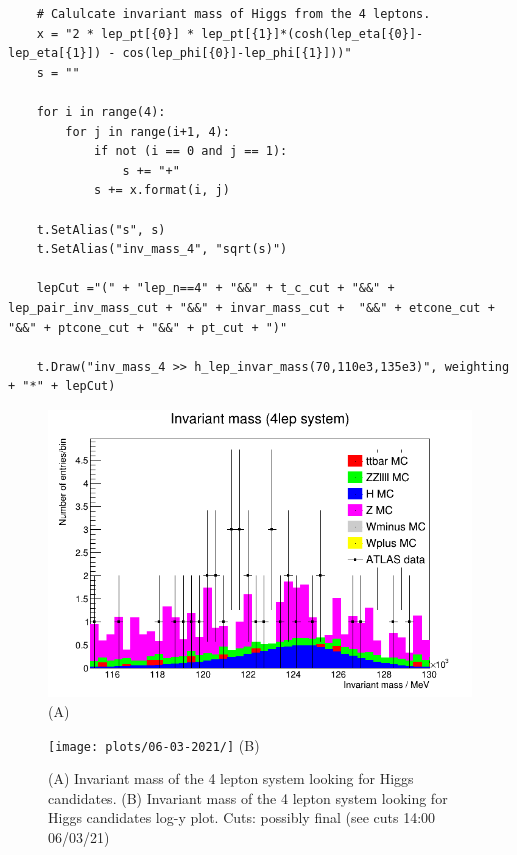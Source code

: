 \begin{lstlisting}
    # Calulcate invariant mass of Higgs from the 4 leptons.
    x = "2 * lep_pt[{0}] * lep_pt[{1}]*(cosh(lep_eta[{0}]-lep_eta[{1}]) - cos(lep_phi[{0}]-lep_phi[{1}]))"
    s = ""

    for i in range(4):
        for j in range(i+1, 4):
            if not (i == 0 and j == 1):
                s += "+"
            s += x.format(i, j)
 
    t.SetAlias("s", s)
    t.SetAlias("inv_mass_4", "sqrt(s)")

    lepCut ="(" + "lep_n==4" + "&&" + t_c_cut + "&&" + lep_pair_inv_mass_cut + "&&" + invar_mass_cut +  "&&" + etcone_cut + "&&" + ptcone_cut + "&&" + pt_cut + ")"
    
    t.Draw("inv_mass_4 >> h_lep_invar_mass(70,110e3,135e3)", weighting + "*" + lepCut)
\end{lstlisting}

\begin{figure}[h!]
    \centering
    \begin{minipage}{0.5\textwidth}
        \centering
        \includegraphics[width=\linewidth]{plots/06-03-2021/14-00_06-03-21.png}
        (A)
    \end{minipage}\hfill
    \begin{minipage}{0.5\textwidth}
        \centering
        \texttt{[image: plots/06-03-2021/]}
        (B)
    \end{minipage}
    \caption{(A) Invariant mass of the 4 lepton system looking for Higgs candidates. (B) Invariant mass of the 4 lepton system looking for Higgs candidates log-y plot.  Cuts: possibly final (see cuts 14:00 06/03/21)}
    \label{fig:14-00_06-03-21}
\end{figure}

